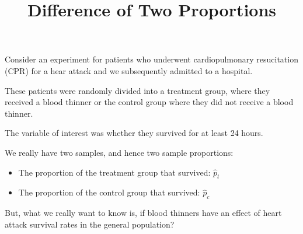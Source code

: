 \documentclass{beamer}
\title[MA205 - Section 6.2]{Difference of Two Proportions}
\begin{document}
\begin{frame}
  \titlepage
\end{frame}

\begin{frame}
  \begin{example}\label{CPR}
    \vspace{-2mm}
    Consider an experiment for patients who underwent cardiopulmonary resucitation (CPR) for a hear attack and we subsequently admitted to a hospital.\pause

    \vspace{1mm}
    These patients were randomly divided into a treatment group, where they received a blood thinner or the control group where they did not receive a blood thinner.\pause

    \vspace{1mm}
    The variable of interest was whether they survived for at least 24 hours.\pause

    \vspace{1mm}
    We really have two samples, and hence two sample proportions:
    \begin{itemize}
    \item The proportion of the treatment group that survived: $\hat{p}_{t}$
    \item The proportion of the control group that survived: $\hat{p}_{c}$
    \end{itemize}\pause

    \pause
    \pause

    \vspace{1mm}
    But, what we really want to know is, if blood thinners have an effect of heart attack survival rates in the general population?
  \end{example}
\end{frame}
\end{document}
